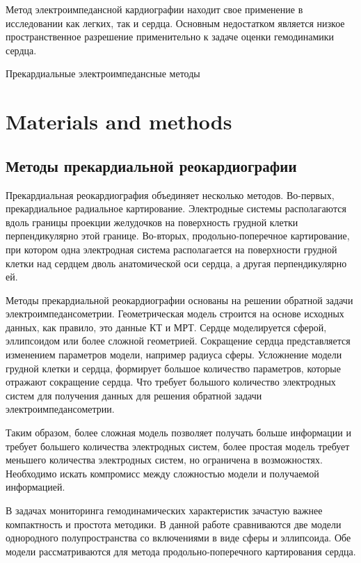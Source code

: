 \documentclass[conference]{IEEEtran}
\begin{document}
Метод электроимпедансной кардиографии находит свое применение в исследовании как легких, так и сердца.
Основным недостатком является низкое пространственное разрешение применительно к задаче оценки гемодинамики сердца.

Прекардиальные электроимпедансные методы

\section{Materials and methods}

\subsection{Методы прекардиальной реокардиографии}

Прекардиальная реокардиография объединяет несколько методов.
Во-первых, прекардиальное радиальное картирование.
Электродные системы располагаются вдоль границы проекции желудочков на поверхность грудной клетки перпендикулярно этой границе.
Во-вторых, продольно-поперечное картирование, при котором одна электродная система располагается на поверхности грудной клетки над сердцем дволь анатомической оси сердца, а другая перпендикулярно ей.

Методы прекардиальной реокардиографии основаны на решении обратной задачи электроимпедансометрии.
Геометрическая модель строится на основе исходных данных, как правило, это данные КТ и МРТ.
Сердце моделируется сферой, эллипсоидом или более сложной геометрией.
Сокращение сердца представляется изменением параметров модели, например радиуса сферы.
Усложнение модели грудной клетки и сердца, формирует большое количество параметров, которые отражают сокращение сердца.
Что требует большого количество электродных систем для получения данных для решения обратной задачи электроимпедансометрии.

Таким образом, более сложная модель позволяет получать больше информации и требует большего количества электродных систем, более простая модель требует меньшего количества электродных систем, но ограничена в возможностях.
Необходимо искать компромисс между сложностью модели и получаемой информацией.

В задачах мониторинга гемодинамических характеристик зачастую важнее компактность и простота методики.
В данной работе сравниваются две модели однородного полупространства со включениями в виде сферы и эллипсоида. Обе модели рассматриваются для метода продольно-поперечного картирования сердца.
\end{document}
